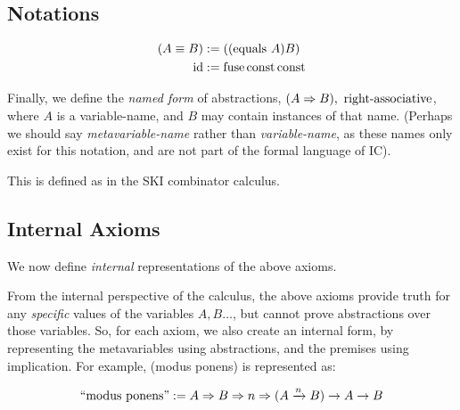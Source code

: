 \documentclass{article}
\begin{document}
  \subsection{Notations}


  \newcommand{\ic}[1]{#1}
  
  
  \newcommand{\equals}{\equiv}

  \begin{align*}
    (A \equals B) &:= ((\mathrm{equals}\ A) B)\\
    \id &:= \fuse \const \const\\
  \end{align*}

  Finally, we define the \emph{named form} of abstractions, $(\nameabst{A}B),\ \operatorname{right-associative}$, where $A$ is a variable-name, and $B$ may contain instances of that name. (Perhaps we should say \emph{metavariable-name} rather than \emph{variable-name}, as these names only exist for this notation, and are not part of the formal language of IC).
  
  This is defined as in the SKI combinator calculus.

  \subsection{Internal Axioms}

  We now define \emph{internal} representations of the above axioms.

  From the internal perspective of the calculus, the above axioms provide truth for any \emph{specific} values of the variables $A, B\dots$, but cannot prove abstractions over those variables.
  So, for each axiom, we also create an internal form, by representing the metavariables using abstractions, and the premises using implication.
  For example, (modus ponens) is represented as:

  \begin{equation*}
    \mathrm{``modus\ ponens"} := A \Rightarrow B \Rightarrow n \Rightarrow (A \xrightarrow{n} B) \to A \to B
  \end{equation*}
  
\end{document}
